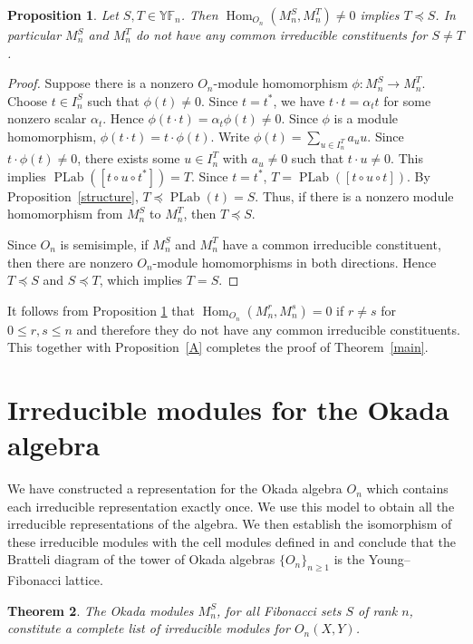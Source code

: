 \documentclass[12pt,reqno]{amsart}
\numberwithin{equation}{section}
\newtheorem{theorem}{Theorem}[section]
\newtheorem{proposition}[theorem]{Proposition}
\theoremstyle{definition}
\theoremstyle{definition}
\newcommand{\YF}{\mathbb{YF}}
\newcommand{\PLab}{\operatorname{PLab}}
\begin{document}
\begin{proposition}\label{B}
Let $S,T\in \YF_n$. Then $\operatorname{Hom}_{O_n}(M_n^S,M_n^T) \neq 0$ implies $T \preccurlyeq S$. In particular $M_n^S$ and $M_n^T$ do not have any common irreducible constituents for $S \neq T$.
\end{proposition}
\begin{proof}
Suppose there is a nonzero $O_n$-module homomorphism
$\phi:M_n^S\to M_n^T$. Choose $t\in I_n^S$ such that
$\phi(t)\neq0$. Since $t=t^*$, we have
$t\cdot t=\alpha_t t$ for some nonzero scalar $\alpha_t$. Hence
$\phi(t\cdot t)=\alpha_t\phi(t)\neq0$.
Since $\phi$ is a module homomorphism,
$\phi(t\cdot t)=t\cdot\phi(t)$.
Write
$\phi(t)=\sum_{u\in I_n^T}a_u u$.
Since $t\cdot\phi(t)\neq0$, there exists some $u\in I_n^T$ with
$a_u\neq0$ such that $t\cdot u\neq0$. This implies
$\PLab([t\circ u\circ t^*])=T$.
Since $t=t^*$,
$T=\PLab([t\circ u\circ t])$.
By Proposition~\ref{structure},
$T\preccurlyeq\PLab(t)=S$.
Thus, if there is a nonzero module homomorphism from $M_n^S$ to $M_n^T$, then
$T\preccurlyeq S$.


Since $O_n$ is semisimple, if $M_n^S$ and $M_n^T$ have a common irreducible constituent, then there are nonzero $O_n$-module homomorphisms in both directions. Hence
$T\preccurlyeq S$ and $S\preccurlyeq T$, which implies $T=S$.
\end{proof}
It follows from Proposition \ref{B} that $\operatorname{Hom}_{O_n}(M_n^r,M_n^s)=0$ if $r \neq s$ for $0 \leq r,s \leq n$ and therefore they do not have any common irreducible constituents. This together with Proposition~\ref{A} completes the proof of Theorem~\ref{main}.


\section{Irreducible modules for the Okada algebra}


We have constructed a representation for the Okada algebra $O_n$ which
contains each irreducible representation exactly once. We use this model
to obtain all the irreducible representations of the algebra. We then establish the isomorphism of these irreducible modules with the cell modules defined in \cite{HivertScott} and conclude that the Bratteli
diagram of the tower of Okada algebras $\{O_n\}_{n\geq 1}$ is the
Young--Fibonacci lattice.


\begin{theorem}
The Okada modules $M_n^S$, for all Fibonacci sets $S$ of rank $n$,
constitute a complete list of irreducible modules for $O_n(X,Y)$.
\end{theorem}
\end{document}
